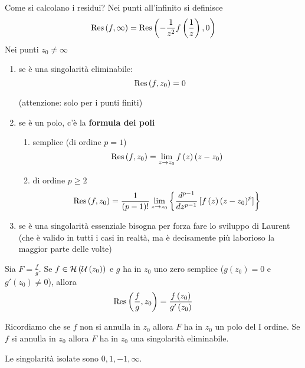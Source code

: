 \begin{rem}
Come si calcolano i residui?
Nei punti all'infinito si definisce
\begin{equation*}
\operatorname{Res} \left( f,\infty \right) =\operatorname{Res} \left( -\frac{1}{z^{2}} f\left(\frac{1}{z}\right) ,0\right)
\end{equation*}
Nei punti $z_{0} \neq \infty $
\begin{enumerate}
\item se è una singolarità eliminabile:\begin{equation*}
\operatorname{Res} \left( f,z_{0}\right) =0
\end{equation*}

(attenzione: solo per i punti finiti)
\item se è un polo, c'è la \textbf{formula dei poli}
\begin{enumerate}
\item semplice (di ordine $p=1$)\begin{equation*}
\operatorname{Res} \left( f,z_{0}\right) =\lim\limits _{z\rightarrow z_{0}} f\left( z\right)\left( z-z_{0}\right)
\end{equation*}
\item di ordine $p\geqslant 2$\begin{equation*}
\operatorname{Res} \left( f,z_{0}\right) =\frac{1}{\left( p-1\right) !}\lim\limits _{z\rightarrow z_{0}}\left\{\frac{d^{p-1}}{dz^{p-1}}\left[ f\left( z\right)\left( z-z_{0}\right)^{p}\right]\right\}
\end{equation*}
\end{enumerate}
\item se è una singolarità essenziale bisogna per forza fare lo sviluppo di Laurent (che è valido in tutti i casi in realtà, ma è decisamente più laborioso la maggior parte delle volte)
\end{enumerate}
\end{rem}
\begin{thm}
Sia $F=\frac{f}{g}$. Se $f\in \mathcal{H} \left(\mathcal{U} \left( z_{0}\right)\right)$ e $g$ ha in $z_{0}$ uno zero semplice ($g\left( z_{0}\right) =0$ e $g'\left( z_{0}\right) \neq 0$), allora\begin{equation*}
\operatorname{Res} \left(\frac{f}{g} ,z_{0}\right) =\frac{f\left( z_{0}\right)}{g'\left( z_{0}\right)}
\end{equation*}

Ricordiamo che se $f$ non si annulla in $z_{0}$ allora $F$ ha in $z_{0}$ un polo del I ordine. Se $f$ si annulla in $z_{0}$ allora $F$ ha in $z_{0}$ una singolarità eliminabile.
\end{thm}
Le singolarità isolate sono $0,1,-1,\infty $.

